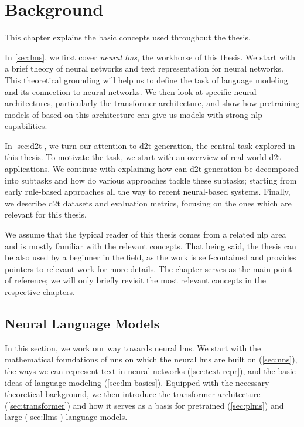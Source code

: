 
\chapter{Background}
\label{chap:background}

This chapter explains the basic concepts used throughout the thesis.

In \autoref{sec:lms}, we first cover \emph{neural \acp{lm}}, the workhorse of this thesis. We start with a brief theory of neural networks and text representation for neural networks. This theoretical grounding will help us to define the task of language modeling and its connection to neural networks. We then look at specific neural architectures, particularly the transformer architecture, and show how pretraining models of based on this architecture can give us models with strong \ac{nlp} capabilities.

In \autoref{sec:d2t}, we turn our attention to \ac{d2t} generation, the central task explored in this thesis. To motivate the task, we start with an overview of real-world \ac{d2t} applications. We continue with explaining how can \ac{d2t} generation be decomposed into subtasks and how do various approaches tackle these subtasks; starting from early rule-based approaches all the way to recent neural-based systems. Finally, we describe \ac{d2t} datasets and evaluation metrics, focusing on the ones which are relevant for this thesis.

We assume that the typical reader of this thesis comes from a related \ac{nlp} area and is mostly familiar with the relevant concepts. That being said, the thesis can be also used by a beginner in the field, as the work is self-contained and provides pointers to relevant work for more details. The chapter serves as the main point of reference; we will only briefly revisit the most relevant concepts in the respective chapters.




\section{Neural Language Models}
\label{sec:lms}
In this section, we work our way towards neural \acp{lm}. We start with the mathematical foundations of \acp{nn} on which the neural \acp{lm} are built on (\autoref{sec:nns}), the ways we can represent text in neural networks (\autoref{sec:text-repr}), and the basic ideas of language modeling (\autoref{sec:lm-basics}). Equipped with the necessary theoretical background, we then introduce the transformer architecture (\autoref{sec:transformer}) and how it serves as a basis for pretrained (\autoref{sec:plms}) and large (\autoref{sec:llms}) language models.

